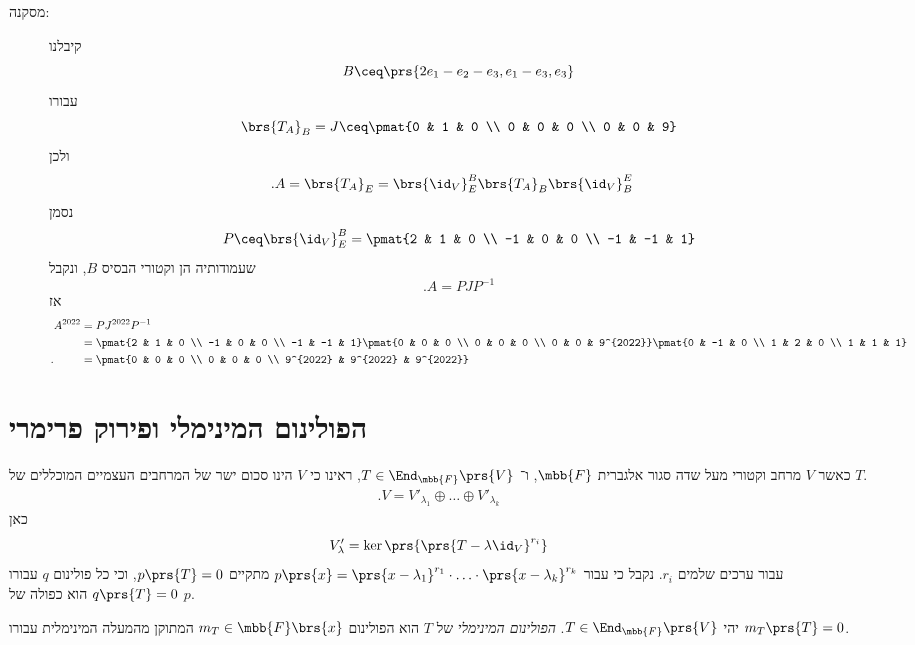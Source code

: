 \documentclass[a4paper,10pt,twoside,openany]{book}
\begin{document}
\begin{solution}
\begin{description}
\item[מסקנה:]
קיבלנו
\[B \ceq \prs{2e_1 - e_2 - e_3, e_1 - e_3, e_3}\]
עבורו
\[\brs{T_A}_B = J \ceq \pmat{0 & 1 & 0 \\ 0 & 0 & 0 \\ 0 & 0 & 9}\]
ולכן
\begin{align*}
\text{.} A &= \brs{T_A}_E
= \brs{\id_V}^{B}_E \brs{T_A}_B \brs{\id_V}^E_B
\end{align*}
נסמן
\[P \ceq \brs{\id_V}^B_E = \pmat{2 & 1 & 0 \\ -1 & 0 & 0 \\ -1 & -1 & 1}\]
שעמודותיה הן וקטורי הבסיס
$B$,
ונקבל
\[\text{.} A = P J P^{-1}\]
אז
\begin{align*}
A^{2022} &= P J^{2022} P^{-1}
\\&= \pmat{2 & 1 & 0 \\ -1 & 0 & 0 \\ -1 & -1 & 1} \pmat{0 & 0 & 0 \\ 0 & 0 & 0 \\ 0 & 0 & 9^{2022}} \pmat{0 & -1 & 0 \\ 1 & 2 & 0 \\ 1 & 1 & 1}
\\ \text{.} \hphantom{A^{2022}} &= \pmat{0 & 0 & 0 \\ 0 & 0 & 0 \\ 9^{2022} & 9^{2022} & 9^{2022}}
\end{align*}
\end{description}
\end{solution}

\section{הפולינום המינימלי ופירוק פרימרי}

כאשר
$V$
מרחב וקטורי מעל שדה סגור אלגברית
$\mbb{F}$,
ו־%
$T \in \End_{\mbb{F}}\prs{V}$,
ראינו כי
$V$
הינו סכום ישר של המרחבים העצמיים המוכללים של
$T$.
\begin{align*}
\text{.} V = V'_{\lambda_1} \oplus \ldots \oplus V'_{\lambda_k}
\end{align*}
כאן
\[V'_{\lambda} = \ker\prs{\prs{T - \lambda \id_V}^{r_i}}\]
עבור ערכים שלמים
$r_i$.
נקבל כי עבור
$p\prs{x} = \prs{x - \lambda_1}^{r_1} \cdot \ldots \cdot \prs{x- \lambda_k}^{r_k}$
מתקיים
$p\prs{T} = 0$,
וכי כל פולינום
$q$
עבורו
$q\prs{T} = 0$
הוא כפולה של
$p$.

\begin{definition}
יהי
$T \in \End_{\mbb{F}}\prs{V}$.
\emph{הפולינום המינימלי}
של
$T$
הוא הפולינום
$m_T \in \mbb{F}\brs{x}$
המתוקן מהמעלה המינימלית עבורו
$m_T\prs{T} = 0$.
\end{definition}
\end{document}
